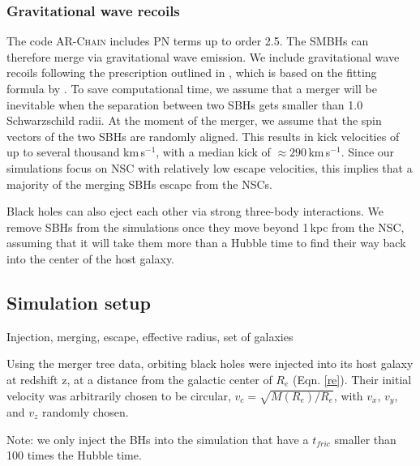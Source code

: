 \documentclass[english, apj]{emulateapj}
\begin{document}
\subsubsection{Gravitational wave recoils}
The code \textsc{AR-Chain} includes PN terms up to order 2.5. The SMBHs can therefore merge via gravitational wave emission. We include gravitational wave recoils following the prescription outlined in \citet{2015ApJ...799..178K}, which is based on the fitting formula by \citet{2012PhRvD..85h4015L}. To save computational time, we assume that a merger will be inevitable when the separation between two SBHs gets smaller than 1.0 Schwarzschild radii. At the moment of the merger, we assume that the spin vectors of the two SBHs are randomly aligned. This results in kick velocities of up to several thousand km\,s$^{-1}$, with a median kick of $\approx 290$\,km\,s$^{-1}$. Since our simulations focus on NSC with relatively low escape velocities, this implies that a majority of the merging SBHs escape from the NSCs. 

Black holes can also eject each other via strong three-body interactions. We remove SBHs from the simulations once they move beyond 1\,kpc from the NSC, assuming that it will take them more than a Hubble time to find their way back into the center of the host galaxy.


\subsection{Simulation setup}
Injection, merging, escape, effective radius, set of galaxies

Using the merger tree data, orbiting black holes were injected into its host galaxy at redshift z, at a distance from the galactic center of $R_{e}$ (Eqn. \ref{re}).  Their initial velocity was arbitrarily chosen to be circular, $v_c = \sqrt{M(R_e)/R_e}$, with $v_x$, $v_y$, and $v_z$ randomly chosen.

Note: we only inject the BHs into the simulation that have a $t_{fric}$ smaller than 100 times the Hubble time.
\end{document}
